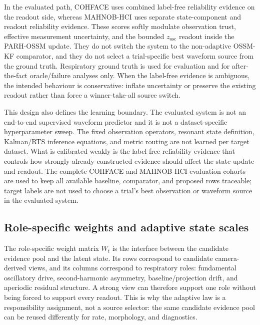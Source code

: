 \documentclass[fleqn,10pt]{wlscirep}
\begin{document}
In the evaluated path, COHFACE uses combined label-free reliability evidence
on the readout side, whereas MAHNOB-HCI uses separate state-component and
readout reliability evidence. These scores softly modulate
observation trust, effective measurement uncertainty, and the bounded
$z_{\mathrm{osc}}$ readout inside the PARH-OSSM update. They do not switch the
system to the non-adaptive OSSM-KF comparator, and they do not select a
trial-specific best waveform source from the ground truth. Respiratory ground
truth is used for evaluation and for after-the-fact oracle/failure analyses
only. When the label-free evidence is ambiguous, the intended behaviour is
conservative: inflate uncertainty or preserve the existing readout rather than
force a winner-take-all source switch.

This design also defines the learning boundary. The evaluated system is not an
end-to-end supervised waveform predictor and it is not a dataset-specific
hyperparameter sweep. The fixed observation operators, resonant state
definition, Kalman/RTS inference equations, and metric routing are not learned
per target dataset. What is calibrated weakly is the label-free reliability
evidence that controls how strongly already constructed evidence
should affect the state update and readout. The complete COHFACE and
MAHNOB-HCI evaluation cohorts are used to keep all available
baseline, comparator, and proposed rows traceable; target labels are not used
to choose a trial's best observation or waveform source in the evaluated
system.

\subsection*{Role-specific weights and adaptive state scales}
The role-specific weight matrix $W_t$ is the interface between the candidate
evidence pool and the latent state. Its rows correspond to candidate
camera-derived views, and its columns correspond to respiratory roles:
fundamental oscillatory drive, second-harmonic asymmetry, baseline/projection
drift, and aperiodic residual structure. A strong view can therefore support
one role without being forced to support every readout. This is why the
adaptive law is a responsibility assignment, not a source selector: the same
candidate evidence pool can be reused differently for rate, morphology, and
diagnostics.
\end{document}
